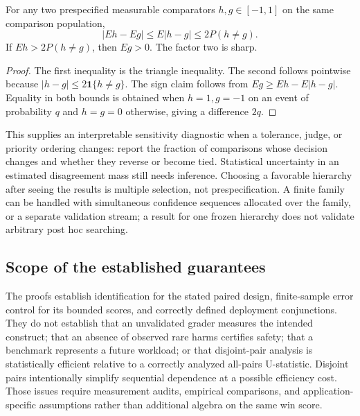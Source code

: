\begin{proposition}
\label{prop:sensitivity}
For any two prespecified measurable comparators $h,g\in[-1,1]$ on the
same comparison population,
\[
 |E h-E g|\leq E|h-g|\leq2P(h\ne g).
\]
If $Eh>2P(h\ne g)$, then $Eg>0$. The factor two is sharp.
\end{proposition}
\begin{proof}
The first inequality is the triangle inequality. The second follows
pointwise because $|h-g|\leq2\mathbf1\{h\ne g\}$.
The sign claim follows from $Eg\geq Eh-E|h-g|$.
Equality in both bounds is obtained when $h=1,g=-1$ on an event of
probability $q$ and $h=g=0$ otherwise, giving a difference $2q$.
\end{proof}

This supplies an interpretable sensitivity diagnostic when a tolerance,
judge, or priority ordering changes: report the fraction of comparisons
whose decision changes and whether they reverse or become tied.
Statistical uncertainty in an estimated disagreement mass still needs
inference. Choosing a favorable hierarchy after seeing the results is
multiple selection, not prespecification. A finite family can be handled
with simultaneous confidence sequences allocated over the family, or a
separate validation stream; a result for one frozen hierarchy does not
validate arbitrary post hoc searching.

\subsection{Scope of the established guarantees}

The proofs establish identification for the stated paired design,
finite-sample error control for its bounded scores, and correctly
defined deployment conjunctions. They do not establish that an
unvalidated grader measures the intended construct; that an absence of
observed rare harms certifies safety; that a benchmark represents a
future workload; or that disjoint-pair analysis is statistically
efficient relative to a correctly analyzed all-pairs U-statistic.
Disjoint pairs intentionally simplify sequential dependence at a
possible efficiency cost. Those issues require measurement audits,
empirical comparisons, and application-specific assumptions rather than
additional algebra on the same win score.
